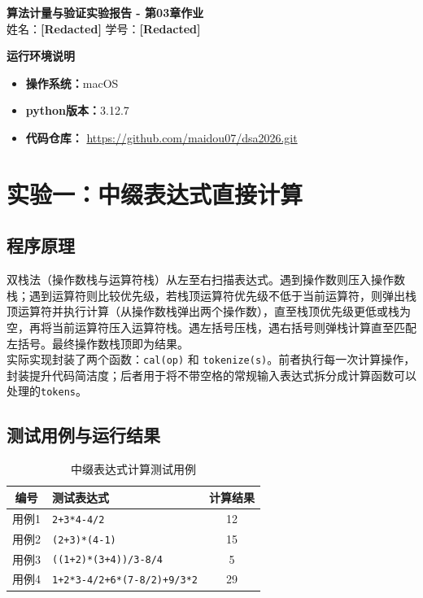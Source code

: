\documentclass[a4paper, 11pt]{ctexart}
\begin{document}
\begin{center}
\LARGE\textbf{算法计量与验证实验报告 - 第03章作业}\\[1em]
\large 姓名：\textbf{[Redacted]} \quad 学号：\textbf{[Redacted]}
\end{center}

\vspace{2em}

\textbf{运行环境说明}
\begin{itemize}[itemsep=0.2em, topsep=0.2em]
\item \textbf{操作系统：}macOS
\item \textbf{python版本：}3.12.7
\item \textbf{代码仓库：} \url{https://github.com/maidou07/dsa2026.git}
\end{itemize}

\section*{实验一：中缀表达式直接计算}

\subsection*{程序原理}

双栈法（操作数栈与运算符栈）从左至右扫描表达式。遇到操作数则压入操作数栈；遇到运算符则比较优先级，若栈顶运算符优先级不低于当前运算符，则弹出栈顶运算符并执行计算（从操作数栈弹出两个操作数），直至栈顶优先级更低或栈为空，再将当前运算符压入运算符栈。遇左括号压栈，遇右括号则弹栈计算直至匹配左括号。最终操作数栈顶即为结果。\\

实际实现封装了两个函数：\texttt{cal(op)} 和 \texttt{tokenize(s)}。前者执行每一次计算操作，封装提升代码简洁度；后者用于将不带空格的常规输入表达式拆分成计算函数可以处理的\texttt{tokens}。
\subsection*{测试用例与运行结果}

\begin{table}[H]
\centering
\begin{tabular}{clc}
\toprule
\textbf{编号} & \textbf{测试表达式} & \textbf{计算结果} \\
\midrule
用例1 & \texttt{2+3*4-4/2} & 12 \\
用例2 & \texttt{(2+3)*(4-1)} & 15 \\
用例3 & \texttt{((1+2)*(3+4))/3-8/4} & 5 \\
用例4 & \texttt{1+2*3-4/2+6*(7-8/2)+9/3*2} & 29 \\
\bottomrule
\end{tabular}
\caption{中缀表达式计算测试用例}
\end{table}
\end{document}
